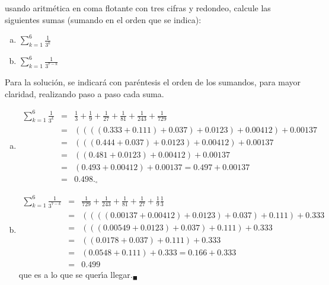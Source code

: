 \begin{enunciado}
 usando aritm\'etica en coma flotante con tres cifras y redondeo, calcule las siguientes sumas (sumando en el orden que se indica):
 \begin{multicols}{2}
  \begin{enumerate}[(a)]
   \item $\sum_{k=1}^6 \frac{1}{3^k}$
   
   \item $\sum_{k=1}^6 \frac{1}{3^{7-k}}$
  \end{enumerate}
 \end{multicols}
\end{enunciado}

\begin{solucion}
 Para la soluci\'on, se indicar\'a con par\'entesis el orden de los sumandos, para mayor claridad, realizando paso a paso cada suma.
 \begin{enumerate}[(a)]
  \item 
  \begin{eqnarray*}
   \sum_{k=1}^6 \frac{1}{3^k} & = & \frac{1}{3} + \frac{1}{9} + \frac{1}{27} + \frac{1}{81} + \frac{1}{243} + \frac{1}{729} \\
   & = & \left( \left( \left( (0.333 + 0.111) + 0.037\right) + 0.0123\right) + 0.00412\right) + 0.00137 \\
   & = & \left( \left( (0.444 + 0.037) + 0.0123\right) + 0.00412\right) + 0.00137 \\
   & = & \left( (0.481 + 0.0123) + 0.00412\right) + 0.00137 \\
   & = & (0.493 + 0.00412) + 0.00137 = 0.497 + 0.00137 \\
   & = & 0.498._{\square}
  \end{eqnarray*}

  \item 
  \begin{eqnarray*}
   \sum_{k=1}^6 \frac{1}{3^{7-k}} & = & \frac{1}{729} + \frac{1}{243} + \frac{1}{81} + \frac{1}{27} + \frac{1}{9} \frac{1}{3} \\
   & = & \left( \left( \left( (0.00137 + 0.00412) + 0.0123\right) + 0.037\right) + 0.111\right) + 0.333 \\
   & = & \left( \left( (0.00549 + 0.0123) + 0.037\right) + 0.111\right) + 0.333 \\
   & = & \left( (0.0178 + 0.037) + 0.111\right) + 0.333 \\
   & = & (0.0548 + 0.111) + 0.333 = 0.166 + 0.333 \\
   & = & 0.499
  \end{eqnarray*}
  que es a lo que se quer\'{\i}a llegar.${}_{\blacksquare}$
 \end{enumerate}
\end{solucion}
